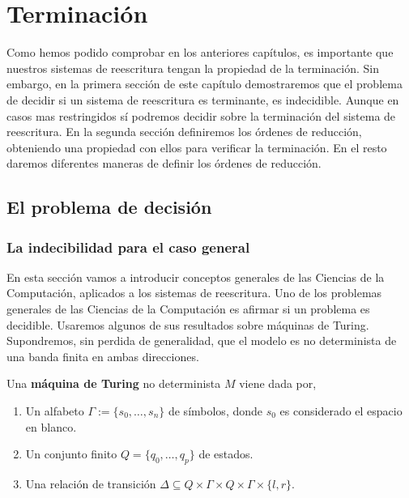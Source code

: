 \chapter{Terminación} \label{cap:term}

Como hemos podido comprobar en los anteriores capítulos, es importante
que nuestros sistemas de reescritura tengan la propiedad de la
terminación. Sin embargo, en la primera sección de este capítulo
demostraremos que el problema de decidir si un sistema de reescritura
es terminante, es indecidible. Aunque en casos mas restringidos sí
podremos decidir sobre la terminación del sistema de reescritura. En
la segunda sección definiremos los órdenes de reducción, obteniendo
una propiedad con ellos para verificar la terminación. En el resto
daremos diferentes maneras de definir los órdenes de reducción.

\section{El problema de decisión}

\subsection{La indecibilidad para el caso general}

En esta sección vamos a introducir conceptos generales de las Ciencias
de la Computación, aplicados a los sistemas de reescritura. Uno de los
problemas generales de las Ciencias de la Computación es afirmar si un
problema es decidible. Usaremos algunos de sus resultados sobre
máquinas de Turing. Supondremos, sin perdida de generalidad, que el
modelo es no determinista de una banda finita en ambas direcciones.

\begin{defi} 
  Una \textbf{máquina de Turing} no determinista $M$ viene dada por,
  \begin{enumerate}
  \item Un alfabeto $\Gamma := \{s_0, \dots, s_n \}$ de símbolos,
    donde $s_0$ es considerado el espacio en blanco.
  \item Un conjunto finito $Q = \{q_0, \dots, q_p \}$ de estados.
  \item Una relación de transición
    $\Delta \subseteq Q \times \Gamma \times Q \times \Gamma \times \{
    l,r \} $.
  \end{enumerate}
\end{defi}

